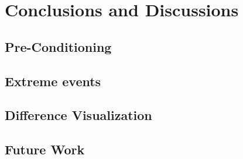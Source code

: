 \chapter[Conclusions and Discussions]{Conclusions and Discussions}
\section{Pre-Conditioning}
\section{Extreme events}
\section{Difference Visualization}

\section{Future Work}
